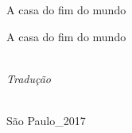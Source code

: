 
{\centering\vspace*{10em}\thispagestyle{empty}
{\huge A casa do fim do mundo\par}}

\cleardoublepage

{\centering\vspace*{10em}\thispagestyle{empty}
{\huge A casa do fim do mundo\par}\bigskip
{\Large{}}

\vspace*{10em}
{}\\
{\small\textit{Tradução}}\medskip

\vfill

\logoum\\
{\normalsize São Paulo\_2017}\par}

\clearpage

